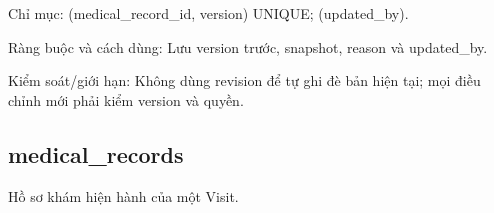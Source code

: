 Chỉ mục:\allowbreak{} (medical\_\allowbreak{}record\_\allowbreak{}id, version) UNIQUE; (updated\_\allowbreak{}by).\allowbreak{}

Ràng buộc và cách dùng:\allowbreak{} Lưu version trước, snapshot, reason và updated\_\allowbreak{}by.\allowbreak{}

Kiểm soát/\allowbreak{}giới hạn:\allowbreak{} Không dùng revision để tự ghi đè bản hiện tại; mọi điều chỉnh mới phải kiểm version và quyền.\allowbreak{}

\clearpage

\subsection{medical\_\allowbreak{}records}
Hồ sơ khám hiện hành của một Visit.\allowbreak{}



